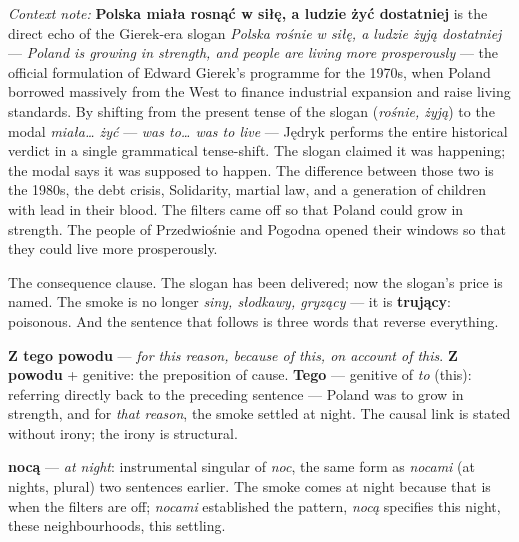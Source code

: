 \medskip
\noindent\textit{Context note:} \textbf{Polska miała
rosnąć w siłę, a ludzie żyć dostatniej} is the direct
echo of the Gierek-era slogan \textit{Polska rośnie
w siłę, a ludzie żyją dostatniej} --- \textit{Poland
is growing in strength, and people are living more
prosperously} --- the official formulation of Edward
Gierek's programme for the 1970s, when Poland borrowed
massively from the West to finance industrial
expansion and raise living standards. By shifting
from the present tense of the slogan (\textit{rośnie,
żyją}) to the modal \textit{miała\ldots{} żyć} ---
\textit{was to\ldots{} was to live} --- Jędryk
performs the entire historical verdict in a single
grammatical tense-shift. The slogan claimed it was
happening; the modal says it was supposed to happen.
The difference between those two is the 1980s,
the debt crisis, Solidarity, martial law, and a
generation of children with lead in their blood.
The filters came off so that Poland could grow in
strength. The people of Przedwiośnie and Pogodna
opened their windows so that they could live
more prosperously.



The consequence clause. The slogan has been delivered;
now the slogan's price is named. The smoke is no longer
\textit{siny, słodkawy, gryzący} --- it is \textbf{trujący}:
poisonous. And the sentence that follows is three words
that reverse everything.

\textbf{Z tego powodu} --- \textit{for this reason,
because of this, on account of this}. \textbf{Z powodu}
+ genitive: the preposition of cause. \textbf{Tego}
--- genitive of \textit{to} (this): referring directly
back to the preceding sentence --- Poland was to grow
in strength, and for \textit{that reason}, the smoke
settled at night. The causal link is stated without
irony; the irony is structural.

\textbf{nocą} --- \textit{at night}: instrumental
singular of \textit{noc}, the same form as
\textit{nocami} (at nights, plural) two sentences
earlier. The smoke comes at night because that is
when the filters are off; \textit{nocami} established
the pattern, \textit{nocą} specifies this night,
these neighbourhoods, this settling.

